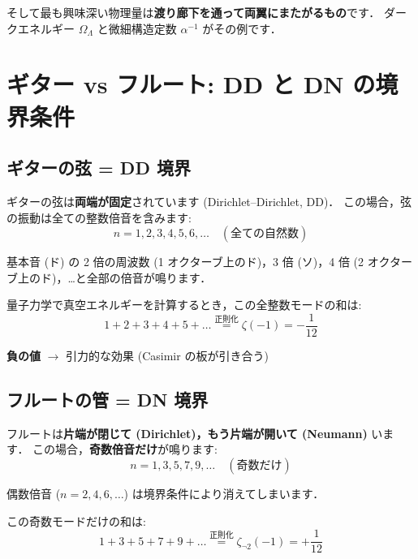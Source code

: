 \documentclass[11pt,a4paper]{article}
\begin{document}
そして最も興味深い物理量は\textbf{渡り廊下を通って両翼にまたがるもの}です．
ダークエネルギー $\Omega_\Lambda$ と微細構造定数 $\alpha^{-1}$ がその例です．

\section{ギター vs フルート: DD と DN の境界条件}

\subsection{ギターの弦 = DD 境界}

ギターの弦は\textbf{両端が固定}されています (Dirichlet--Dirichlet, DD)．
この場合，弦の振動は全ての整数倍音を含みます:
\begin{equation*}
n = 1, 2, 3, 4, 5, 6, \ldots \quad (\text{全ての自然数})
\end{equation*}

基本音 (ド) の 2 倍の周波数 (1 オクターブ上のド)，3 倍 (ソ)，4 倍 (2
オクターブ上のド)，\ldots と全部の倍音が鳴ります．

量子力学で真空エネルギーを計算するとき，この全整数モードの和は:
\begin{equation*}
1 + 2 + 3 + 4 + 5 + \ldots \stackrel{\text{正則化}}{=} \zeta(-1) = -\frac{1}{12}
\end{equation*}

\textbf{負の値} $\to$ 引力的な効果 (Casimir の板が引き合う)

\subsection{フルートの管 = DN 境界}

フルートは\textbf{片端が閉じて (Dirichlet)，もう片端が開いて (Neumann)} います．
この場合，\textbf{奇数倍音だけ}が鳴ります:
\begin{equation*}
n = 1, 3, 5, 7, 9, \ldots \quad (\text{奇数だけ})
\end{equation*}

偶数倍音 ($n = 2, 4, 6, \ldots$) は境界条件により消えてしまいます．

この奇数モードだけの和は:
\begin{equation*}
1 + 3 + 5 + 7 + 9 + \ldots \stackrel{\text{正則化}}{=} \zeta_{\neg 2}(-1) = +\frac{1}{12}
\end{equation*}
\end{document}
